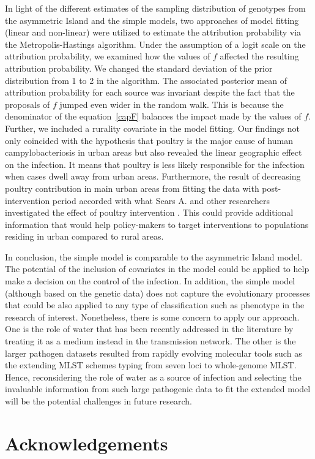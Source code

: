 \documentclass[times, doublespace]{simauth}%
\begin{document}
In light of the different estimates of the sampling distribution of genotypes from the asymmetric Island and the simple models, two approaches of model fitting (linear and non-linear) were utilized to estimate the attribution probability via the Metropolis-Hastings algorithm. Under the assumption of a logit scale on the attribution probability, we examined how the values of $f$ affected the resulting attribution probability. We changed the standard deviation of the prior distribution from 1 to 2 in the algorithm. The associated posterior mean of attribution probability for each source was invariant despite the fact that the proposals of $f$ jumped even wider in the random walk. This is because the denominator of the equation~\eqref{capF} balances the impact made by the values of $f$. Further, we included a rurality covariate in the model fitting. Our findings not only coincided with the hypothesis that poultry is the major cause of human campylobacteriosis in urban areas \cite{MullA, Marsh, MullM, Leve} but also revealed the linear geographic effect on the infection. It means that poultry is less likely responsible for the infection when cases dwell away from urban areas. Furthermore, the result of decreasing poultry contribution in main urban areas from fitting the data with post-intervention period accorded with what Sears A. and other researchers investigated the effect of poultry intervention \cite{AnnS}. This could provide additional information that would help policy-makers to target interventions to populations residing in urban compared to rural areas.

In conclusion, the simple model is comparable to the asymmetric Island model. The potential of the inclusion of covariates in the model could be applied to help make a decision on the control of the infection. In addition, the simple model (although based on the genetic data) does not capture the evolutionary processes that could be also applied to any type of classification such as phenotype in the research of interest. Nonetheless, there is some concern to apply our approach. One is the role of water that has been recently addressed in the literature \cite{Wagen} by treating it as a medium instead in the transmission network. The other is the larger pathogen datasets resulted from rapidly evolving molecular tools such as the extending MLST schemes typing from seven loci to whole-genome MLST. Hence, reconsidering the role of water as a source of infection and selecting the invaluable information from such large pathogenic data to fit the extended model will be the potential challenges in future research.

\section*{Acknowledgements}


\end{document}
